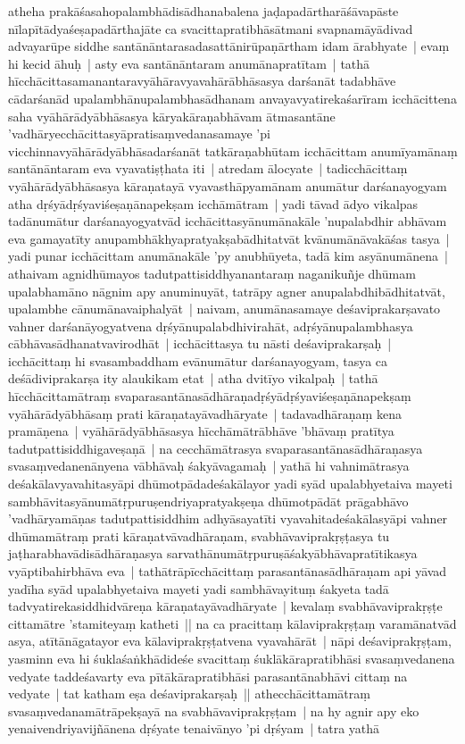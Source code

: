 \documentclass[article,12pt,a4paper]{memoir}%
\begin{document}
	  
	  \pstart \leavevmode%
	\label{thakur75-145.3}atheha prakāśasahopalambhādisādhanabalena jaḍapadārtharāśāvapāste nīlapītādyaśeṣapadārthajāte ca svacittapratibhāsātmani svapnamāyādivad advayarūpe siddhe santānāntarasadasattānirūpaṇārtham idam ārabhyate | \label{thakur75-145.6} evaṃ hi kecid āhuḥ | asty eva santānāntaram anumānapratītam | tathā hīcchācittasamanantaravyāhāravyavahārābhāsasya darśanāt tadabhāve cādarśanād upalambhānupalambhasādhanam anvayavyatirekaśarīram icchācittena saha vyāhārādyābhāsasya kāryakāraṇabhāvam ātmasantāne 'vadhāryecchācittasyāpratisaṃvedanasamaye 'pi vicchinnavyāhārādyābhāsadarśanāt tatkāraṇabhūtam icchācittam anumīyamānaṃ santānāntaram eva vyavatiṣṭhata iti | \label{thakur75-145.12} atredam ālocyate | tadicchācittaṃ vyāhārādyābhāsasya kāraṇatayā vyavasthāpyamānam anumātur darśanayogyam atha dṛśyādṛśyaviśeṣaṇānapekṣam icchāmātram | yadi tāvad ādyo vikalpas tadānumātur darśanayogyatvād icchācittasyānumānakāle 'nupalabdhir abhāvam eva gamayatīty anupambhākhyapratyakṣabādhitatvāt kvānumānāvakāśas tasya | yadi punar icchācittam anumānakāle 'py anubhūyeta, tadā kim asyānumānena | athaivam agnidhūmayos tadutpattisiddhyanantaraṃ naganikuñje dhūmam upalabhamāno nāgnim apy anuminuyāt, tatrāpy agner anupalabdhibādhitatvāt, upalambhe cānumānavaiphalyāt | naivam, anumānasamaye deśaviprakarṣavato vahner darśanāyogyatvena dṛśyānupalabdhivirahāt, adṛśyānupalambhasya cābhāvasādhanatvavirodhāt | icchācittasya tu nāsti deśaviprakarṣaḥ | icchācittaṃ hi svasambaddham evānumātur darśanayogyam, tasya ca deśādiviprakarṣa ity alaukikam etat | \label{thakur75-145.23} atha dvitīyo vikalpaḥ | tathā hīcchācittamātraṃ svaparasantānasādhāraṇadṛśyādṛśyaviśeṣaṇānapekṣaṃ vyāhārādyābhāsaṃ prati kāraṇatayāvadhāryate | tadavadhāraṇaṃ kena pramāṇena | vyāhārādyābhāsasya hīcchāmātrābhāve 'bhāvaṃ pratītya tadutpattisiddhigaveṣaṇā | na cecchāmātrasya svaparasantānasādhāraṇasya svasaṃvedanenānyena vābhāvaḥ śakyāvagamaḥ | yathā hi vahnimātrasya deśakālavyavahitasyāpi dhūmotpādadeśakālayor yadi syād upalabhyetaiva mayeti sambhāvitasyānumātṛpuruṣendriyapratyakṣeṇa dhūmotpādāt prāgabhāvo 'vadhāryamāṇas tadutpattisiddhim adhyāsayatīti vyavahitadeśakālasyāpi vahner dhūmamātraṃ prati kāraṇatvāvadhāraṇam, svabhāvaviprakṛṣṭasya tu jaṭharabhavādisādhāraṇasya sarvathānumātṛpuruṣāśakyābhāvapratītikasya vyāptibahirbhāva eva | tathātrāpīcchācittaṃ parasantānasādhāraṇam api yāvad yadīha syād upalabhyetaiva mayeti yadi sambhāvayituṃ śakyeta tadā tadvyatirekasiddhidvāreṇa kāraṇatayāvadhāryate | kevalaṃ svabhāvaviprakṛṣṭe cittamātre 'stamiteyaṃ katheti || \label{thakur75-146.7} na ca pracittaṃ kālaviprakṛṣṭaṃ varamānatvād asya, atītānāgatayor eva kālaviprakṛṣṭatvena vyavahārāt | \label{thakur75-146.9} nāpi deśaviprakṛṣṭam, yasminn eva hi śuklaśaṅkhādideśe svacittaṃ śuklākārapratibhāsi svasaṃvedanena vedyate taddeśavarty eva pītākārapratibhāsi parasantānabhāvi cittaṃ na vedyate | tat katham eṣa deśaviprakarṣaḥ || \label{thakur75-146.12} athecchācittamātraṃ svasaṃvedanamātrāpekṣayā na svabhāvaviprakṛṣṭam | na hy agnir apy eko yenaivendriyavijñānena dṛśyate tenaivānyo 'pi dṛśyam | tatra yathā 
\end{document}
